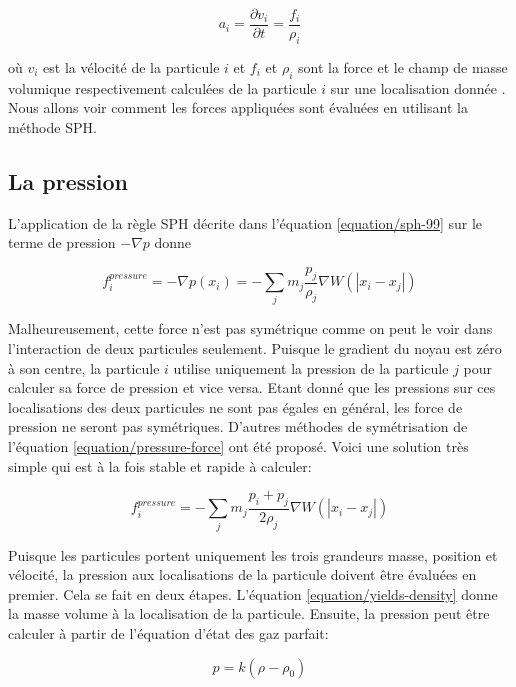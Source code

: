 \documentclass[11pt]{report}
\begin{document}
\begin{equation}
a_i = \frac{\partial v_i}{\partial t} = \frac{f_i}{\rho_i}
\end{equation}

où $v_i$ est la vélocité de la particule $i$ et $f_i$ et $\rho_i$  sont la force et le champ de masse volumique respectivement calculées de la particule $i$ sur une localisation donnée . Nous allons voir comment les forces appliquées sont évaluées en utilisant la méthode SPH.

\subsection{La pression}

L'application de la règle SPH décrite dans l'équation \ref{equation/sph-99} sur le terme  de pression $-\nabla p$ donne

\begin{equation}\label{equation/pressure-force}
f_i^{pressure} = - \nabla p(x_i) = - \sum_j m_j \frac{p_j}{\rho_j} \nabla W(|x_i - x_j|)
\end{equation}

Malheureusement, cette force n'est pas symétrique comme on peut le voir dans l'interaction de deux particules seulement. Puisque le gradient du noyau est zéro à son centre, la particule $i$ utilise uniquement la pression de la particule $j$ pour calculer sa force de pression et vice versa. Etant donné que les pressions sur ces localisations des deux particules ne sont pas égales en général, les force de pression ne seront pas symétriques. D'autres méthodes de symétrisation de l'équation \ref{equation/pressure-force} ont été proposé. Voici une solution très simple qui est à la fois stable et rapide à calculer:

\begin{equation}
f_i^{pressure} = - \sum_j m_j \frac{p_i + p_j}{2\rho_j} \nabla W(|x_i - x_j|)
\end{equation}

Puisque les particules portent uniquement les trois grandeurs masse, position et vélocité, la pression aux localisations de la particule doivent être évaluées en premier. Cela se fait en deux étapes. L'équation \ref{equation/yields-density} donne la masse volume à la localisation de la particule. Ensuite, la pression peut être calculer à partir de l'équation d'état des gaz parfait:

\begin{equation}
p = k(\rho - \rho_0)
\end{equation}
\end{document}
